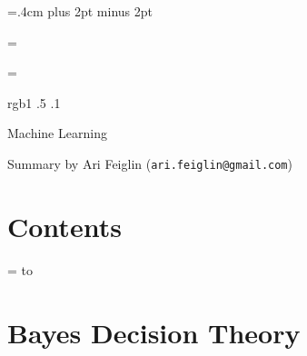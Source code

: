 

\parindent=.4cm
\parskip=3pt plus 2pt minus 2pt



\footline={}


\headline={}

\color rgb{1 .5 .1}

{\def\boxshadowcolor{rgb{.8 .6 0}}

    \centerline{Machine Learning}
    \smallskip
    \centerline{Summary by Ari Feiglin ({\tt ari.feiglin@gmail.com})}

\eppbox

\bigskip

    \section*{Contents}
    
    \tableofcontents
\eppbox

}

\vfill\break

\color{black}

\newif\ifpageodd
\pageoddtrue
\headline={%
    \hbox to \hsize{\color{black}%
        \ifpageodd\hfil{\it\currsubsection\quad\bf\folio}\global\pageoddfalse%
        \else{\bf\folio\quad\it\currsubsection}\hfil\global\pageoddtrue\fi%
    }%
}

\section{Bayes Decision Theory}



\bye

